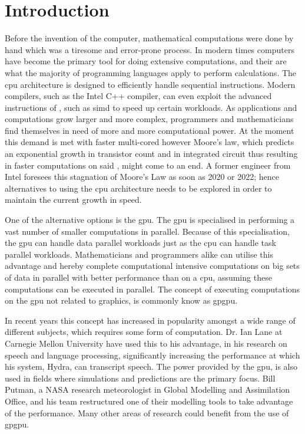 \chapter{Introduction} %
\label{cha:introduction}
Before the invention of the computer, mathematical computations were done by hand which was a tiresome and error-prone process.
In modern times computers have become the primary tool for doing extensive computations, and their  are what the majority of programming languages apply to perform calculations.
The \acrshort{cpu} architecture is designed to efficiently handle sequential instructions. 
Modern compilers, such as the Intel C++ compiler, can even exploit the advanced instructions of , such as \acrfull{simd} to speed up certain workloads. \citep{INTEL_SIMD}
As applications and computations grow larger and more complex, programmers and mathematicians find themselves in need of more and more computational power. \citep[pp. 4]{OpenCL_AMD}
At the moment this demand is met with faster multi-cored  however Moore's law, which predicts an exponential growth in transistor count and in integrated circuit thus resulting in faster computations on said , might come to an end.
A former engineer from Intel foresees this stagnation of Moore's Law as soon as 2020 or 2022; hence alternatives to using the \acrshort{cpu} architecture needs to be explored in order to maintain the current growth in speed.\citep{Moore2013} 

One of the alternative options is the \acrfull{gpu}.
The \acrshort{gpu} is specialised in performing a vast number of smaller computations in parallel.
Because of this specialisation, the \acrshort{gpu} can handle data parallel workloads just as the \acrshort{cpu} can handle task parallel workloads.
Mathematicians and programmers alike can utilise this advantage and hereby complete computational intensive computations on big sets of data in parallel with better performance than on a \acrshort{cpu}, assuming these computations can be executed in parallel.
The concept of executing computations on the \acrshort{gpu} not related to graphics, is commonly know as \acrfull{gpgpu}.

In recent years this concept has increased in popularity amongst a wide range of different subjects, which requires some form of computation. 
Dr. Ian Lane at Carnegie Mellon University have used this to his advantage, in his research on speech and language processing, significantly increasing the performance at which his system, Hydra, can transcript speech. \citep{NvidiaSpotlightIan}
The power provided by the \acrshort{gpu}, is also used in fields where simulations and predictions are the primary focus. 
Bill Putman, a NASA research meteorologist in Global Modelling and Assimilation Office, and his team restructured one of their modelling tools to take advantage of the  performance. \citep{NvidiaSpotlightNasa}
Many other areas of research could benefit from the use of \acrshort{gpgpu}.

